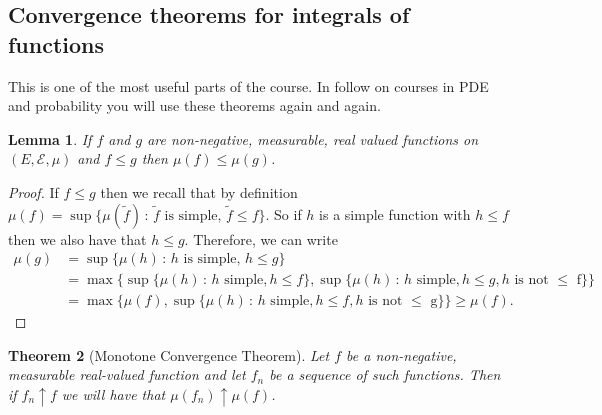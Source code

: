 \documentclass[11pt]{article}
\newtheorem{thm}{Theorem}[section]
\newtheorem{lem}[thm]{Lemma}
\theoremstyle{definition}
\theoremstyle{remark}
\begin{document}
\subsection{Convergence theorems for integrals of functions}
This is one of the most useful parts of the course. In follow on courses in PDE and probability you will use these theorems again and again.
\begin{lem}
If $f$ and $g$ are non-negative, measurable, real valued functions on $(E, \mathcal{E}, \mu)$ and $f \leq g$ then $\mu(f) \leq \mu(g)$.
\end{lem}
\begin{proof}
If $f \leq g$ then we recall that by definition $\mu(f) = \sup\{ \mu(\tilde{f}) \,:\, \mbox{$\tilde{f}$ is simple},\, \tilde{f} \leq f\}$. So if $h$ is a simple function with $h \leq f$ then we also have that $h \leq g$. Therefore, we can write
\begin{align*} \mu(g) &= \sup\{ \mu(h) \,:\, \mbox{$h$ is simple},\, h \leq g\} \\ &= \max\{\sup\{ \mu(h)\, :\, \mbox{$h$ simple}, h \leq f\}, \sup\{ \mu(h)\, :\, \mbox{$h$ simple}, h \leq g, \mbox{$h$ is not $\leq$ f}\} \}\\ &= \max\{ \mu(f), \sup\{ \mu(h)\, :\, \mbox{$h$ simple}, h \leq f, \mbox{$h$ is not $\leq$ g}\}\} \geq \mu(f).\end{align*}
\end{proof}
\begin{thm}[Monotone Convergence Theorem]
Let $f$ be a non-negative, measurable real-valued function and let $f_n$ be a sequence of such functions. Then if $f_n \uparrow f$ we will have that $\mu(f_n) \uparrow \mu(f)$.
\end{thm}
\end{document}
